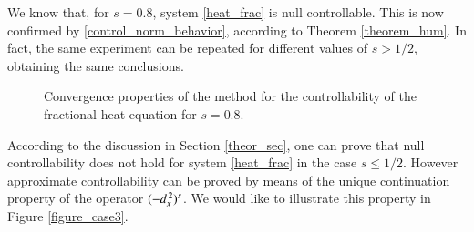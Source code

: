 We know that, for $s=0.8$, system \eqref{heat_frac} is null controllable. This is now confirmed by \eqref{control_norm_behavior}, according to Theorem \ref{theorem_hum}.  In fact, the same experiment can be repeated for different values of $s>1/2$, obtaining the same conclusions. 
\begin{figure}[h]
  \centering
{}
\caption{Convergence properties of the method for the controllability of the fractional heat equation for $s=0.8$.}\label{figure_case1}
\end{figure}

According to the discussion in Section \ref{theor_sec}, one can prove that null controllability does not hold for system \eqref{heat_frac} in the case $s\leq 1/2$. However approximate controllability can be proved by means of the unique continuation property of the operator $(-d_x^{\,2})^{s}$. We would like to illustrate this property in Figure \ref{figure_case3}.

